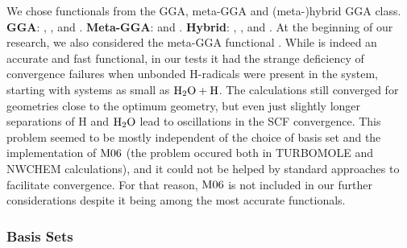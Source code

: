 \documentclass[8.5pt,twoside,twocolumn]{article}
\theoremstyle{standard}
\begin{document}
We chose functionals from the GGA, meta-GGA and (meta-)hybrid GGA class.\newline
\textbf{GGA}: \bp\cite{Becke1988,Perdew1986},
\blyp\cite{Becke1988,LeeYangParr1988}, {\pbe}\cite{PerdewErnzerhofBurke1996}
and \bns\cite{GrimmeB97-D2006}.
\newline
\textbf{Meta-GGA}: \tpss\cite{TaoPerdewStaroverovEtAl2003}
and \pw\cite{ZhaoTruhlar2005}.
\newline \textbf{Hybrid}:
\btlyp\cite{Becke1993,StephensDevlinChabalowskiEtAl1994}, 
{\bhlyp}\cite{Becke1993BHLYP},
{\tpssh}\cite{TaoPerdewStaroverovEtAl2003,StaroverovScuseriaTaoEtAl2003} and
\pbez\cite{PerdewErnzerhofBurke1996,AdamoBarone1999}.
\newline
At the beginning of our research, we also considered the meta-GGA functional
\mos\cite{ZhaoTruhlar2007}. While {\mos} is indeed an accurate and fast
functional, in our tests it had the strange deficiency of convergence failures when unbonded H-radicals
were present in the system, starting with systems as small as $\text H _2 \text O + \text H$.
The calculations still converged for geometries close to the optimum geometry,
but even just slightly longer separations of H and $\text H _2 \text O$ lead to oscillations
in the SCF convergence. This problem seemed to be mostly independent of the
choice of basis set and the implementation of $\text{M06}$ (the problem occured both
in TURBOMOLE\cite{TURBOMOLE} and NWCHEM\cite{nwchem} calculations), and it could not
be helped by standard approaches to facilitate convergence. For that reason,
$\text{M06}$ is not included in our further considerations despite it being among the most accurate functionals.

\subsubsection{Basis Sets}
\label{Sec:Theo:Basis}
\end{document}
